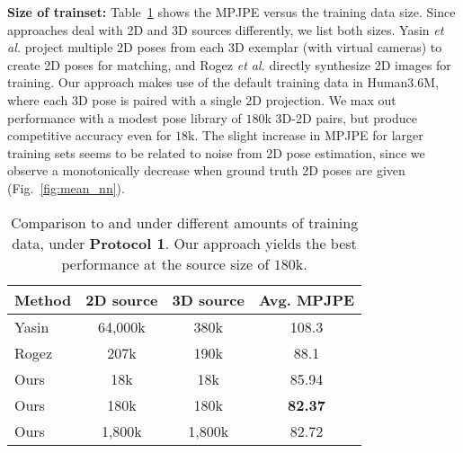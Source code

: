 \documentclass[10pt,twocolumn,letterpaper]{article}
\begin{document}
{\bf Size of trainset:} Table~\ref{table: train_size_compare} shows the MPJPE versus the training data size. Since approaches deal with 2D and 3D sources differently, we list both sizes. Yasin \textit{et al.} \cite{Yasin_2016_CVPR} project multiple 2D poses from each 3D exemplar (with virtual cameras) to create 2D poses for matching, and Rogez \textit{et al.} \cite{rogez2016mocap} directly synthesize 2D images for training. Our approach makes use of the default training data in Human3.6M, where each 3D pose is paired with a single 2D projection. We max out performance with a modest pose library of $180$k 3D-2D pairs, but produce competitive accuracy even for $18$k. The slight increase in MPJPE for larger training sets seems to be related to noise from 2D pose estimation, since we observe a monotonically decrease when ground truth 2D poses are given (Fig.~\ref{fig:mean_nn}).

\begin{table}[!]
\centering
\begin{tabular}{|l|c|c|c|}
\hline
Method & 2D source & 3D source & Avg. MPJPE\\
\hline
\hline
Yasin \cite{Yasin_2016_CVPR} & 64,000k & 380k & 108.3\\
Rogez \cite{rogez2016mocap}& 207k & 190k & 88.1 \\
\hline
Ours & 18k & 18k & 85.94\\
Ours & 180k & 180k & \textbf{82.37}\\
Ours & 1,800k & 1,800k & 82.72\\
\hline
\end{tabular}
\caption{Comparison to \cite{Yasin_2016_CVPR} and \cite{rogez2016mocap} under different amounts of training data, under {\bf Protocol 1}. Our approach yields the best performance at the source size of $180$k.}
\label{table: train_size_compare}
\end{table}
\end{document}
